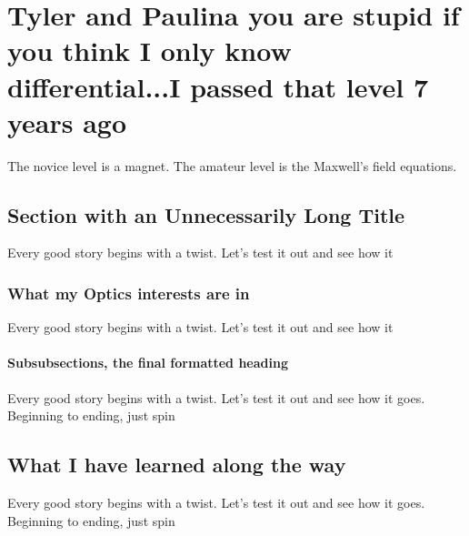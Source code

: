 \chapter{Tyler and Paulina you are stupid if you think I only know differential...I passed that level 7 years ago}

The novice level is a magnet. The amateur level is the Maxwell's field equations. 
\section[What my Optics Studies have been]{Section with an Unnecessarily Long Title}

Every good story begins with a twist. Let's test it out and see how it 

\subsection{What my Optics interests are in}

Every good story begins with a twist. Let's test it out and see how it 

\subsubsection{Subsubsections, the final formatted heading}

Every good story begins with a twist. Let's test it out and see how it goes. Beginning to ending, just spin 

\section{What I have learned along the way}

Every good story begins with a twist. Let's test it out and see how it goes. Beginning to ending, just spin 